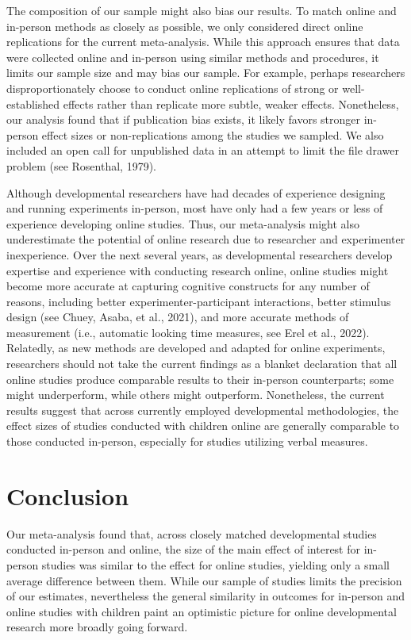 \documentclass[
  man,floatsintext]{apa6}
\begin{document}
The composition of our sample might also bias our results. To match online and in-person methods as closely as possible, we only considered direct online replications for the current meta-analysis. While this approach ensures that data were collected online and in-person using similar methods and procedures, it limits our sample size and may bias our sample. For example, perhaps researchers disproportionately choose to conduct online replications of strong or well-established effects rather than replicate more subtle, weaker effects. Nonetheless, our analysis found that if publication bias exists, it likely favors stronger in-person effect sizes or non-replications among the studies we sampled. We also included an open call for unpublished data in an attempt to limit the file drawer problem (see Rosenthal, 1979).

Although developmental researchers have had decades of experience designing and running experiments in-person, most have only had a few years or less of experience developing online studies. Thus, our meta-analysis might also underestimate the potential of online research due to researcher and experimenter inexperience. Over the next several years, as developmental researchers develop expertise and experience with conducting research online, online studies might become more accurate at capturing cognitive constructs for any number of reasons, including better experimenter-participant interactions, better stimulus design (see Chuey, Asaba, et al., 2021), and more accurate methods of measurement (i.e., automatic looking time measures, see Erel et al., 2022). Relatedly, as new methods are developed and adapted for online experiments, researchers should not take the current findings as a blanket declaration that all online studies produce comparable results to their in-person counterparts; some might underperform, while others might outperform. Nonetheless, the current results suggest that across currently employed developmental methodologies, the effect sizes of studies conducted with children online are generally comparable to those conducted in-person, especially for studies utilizing verbal measures.

\hypertarget{conclusion}{%
\section{Conclusion}\label{conclusion}}

Our meta-analysis found that, across closely matched developmental studies conducted in-person and online, the size of the main effect of interest for in-person studies was similar to the effect for online studies, yielding only a small average difference between them. While our sample of studies limits the precision of our estimates, nevertheless the general similarity in outcomes for in-person and online studies with children paint an optimistic picture for online developmental research more broadly going forward.
\end{document}
